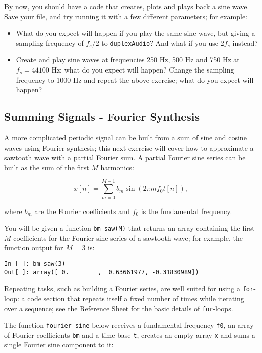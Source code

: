 By now, you should have a code that creates, plots and plays back a sine wave. Save your file, and try running it with a few different parameters; for example:

\begin{itemize}
	\item What do you expect will happen if you play the same sine wave, but giving a sampling frequency of $f_s/2$ to {\tt duplexAudio}? And what if you use $2f_s$ instead?
	\item Create and play sine waves at frequencies 250 Hz, 500 Hz and 750 Hz at $f_s = 44100$ Hz; what do you expect will happen? Change the sampling frequency to 1000 Hz and repeat the above exercise; what do you expect will happen?
\end{itemize}


\subsection{Summing Signals - Fourier Synthesis}

A more complicated periodic signal can be built from a sum of sine and cosine waves using Fourier synthesis; this next exercise will cover how to approximate a sawtooth wave with a partial Fourier sum. A partial Fourier sine series can be built as the sum of the first $M$ harmonics:

\begin{equation}
	x[n] = \sum_{m=0}^{M-1} b_m \sin(2 \pi m f_0 t[n]),
\end{equation}

where $b_m$ are the Fourier coefficients and $f_0$ is the fundamental frequency.

You will be given a function {\tt bm\_saw(M)} that returns an array containing the first $M$ coefficients for the Fourier sine series of a sawtooth wave; for example, the function output for $M=3$ is:

\begin{lstlisting}[frame=single]
In [ ]: bm_saw(3)
Out[ ]: array([ 0.        ,  0.63661977, -0.31830989])
\end{lstlisting}

Repeating tasks, such as building a Fourier series, are well suited for using a {\tt for}-loop: a code section that repeats itself a fixed number of times while iterating over a sequence; see the Reference Sheet for the basic details of {\tt for}-loops.

The function {\tt fourier\_sine} below receives a fundamental frequency {\tt f0}, an array of Fourier coefficients {\tt bm} and a time base {\tt t}, creates an empty array {\tt x} and sums a single Fourier sine component to it:

